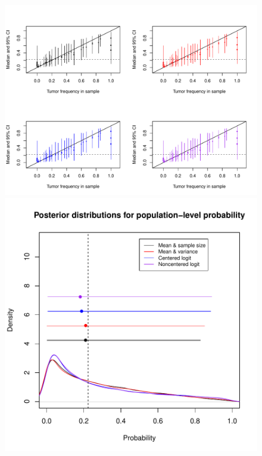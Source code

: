 \documentclass[12pt, oneside, titlepage]{article}   	%
\begin{document}
 \begin{figure}[h]
   \centering
         \includegraphics[page=1,width=.75\textwidth]{../figures/appendix/appendix-1/shrinkage}              
       \includegraphics[page=1,width=.75\textwidth]{../figures/appendix/appendix-1/posteriorProbability}              
    \caption{   }
 \label{fig:...}
\end{figure}


\clearpage

\end{document}
